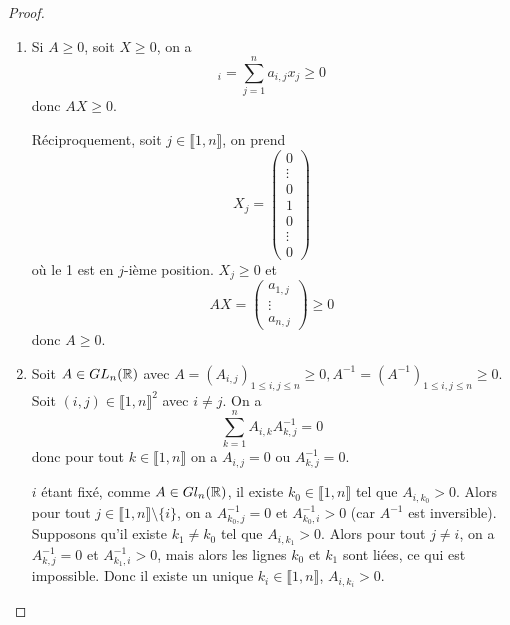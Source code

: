 \documentclass[12pt]{article}
\begin{document}
\begin{proof}
    \phantom{}
    \begin{enumerate}
        \item Si $A\geqslant0$, soit $X\geqslant0$, on a 
        \begin{equation}
            [AX]_{i}=\sum_{j=1}^{n}a_{i,j}x_{j}\geqslant 0
        \end{equation}
        donc $AX\geqslant0$.

        Réciproquement, soit $j\in\llbracket1,n\rrbracket$, on prend 
        \begin{equation}
            X_{j}=
            \begin{pmatrix}
                0\\
                \vdots\\
                0\\
                1\\
                0\\
                \vdots\\
                0    
            \end{pmatrix}
        \end{equation}
        où le 1 est en $j$-ième position. $X_{j}\geqslant0$ et 
        \begin{equation}
            AX=
            \begin{pmatrix}
                a_{1,j}\\
                \vdots\\
                a_{n,j}
            \end{pmatrix}
            \geqslant0
        \end{equation}
        donc $A\geqslant0$.

        \item Soit $A\in GL_{n}(\mathbb{R})$ avec $A=(A_{i,j})_{1\leqslant i,j\leqslant n}\geqslant0,A^{-1}=(A^{-1})_{1\leqslant i,j\leqslant n}\geqslant0$. Soit $(i,j)\in\llbracket1,n\rrbracket^{2}$ avec $i\neq j$. On a 
        \begin{equation}
            \sum_{k=1}^{n}A_{i,k}A^{-1}_{k,j}=0
        \end{equation}
        donc pour tout $k\in\llbracket1,n\rrbracket$ on a $A_{i,j}=0$ ou $A^{-1}_{k,j}=0$.

        $i$ étant fixé, comme $A\in Gl_{n}(\mathbb{R})$, il existe $k_{0}\in\llbracket1,n\rrbracket$ tel que $A_{i,k_{0}}>0$. Alors pour tout $j\in\llbracket1,n\rrbracket\setminus\lbrace i\rbrace$, on a $A^{-1}_{k_{0},j}=0$ et $A^{-1}_{k_{0},i}>0$ (car $A^{-1}$ est inversible). Supposons qu'il existe $k_{1}\neq k_{0}$ tel que $A_{i,k_{1}}>0$. Alors pour tout $j\neq i$, on a $A^{-1}_{k,j}=0$ et $A^{-1}_{k_{1},i}>0$, mais alors les lignes $k_{0}$ et $k_{1}$ sont liées, ce qui est impossible. Donc il existe un unique $k_{i}\in\llbracket1,n\rrbracket$, $A_{i,k_{i}}>0$.


\end{enumerate}
\end{proof}
\end{document}
